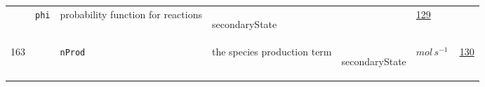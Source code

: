 \begin{longtable}{|p{1cm}|p{2.5cm}|p{4.5cm}|p{8cm}|p{3.0cm}|p{3cm}|p{1cm}|}
             & \verb|phi|
             & probability function for reactions
             & \begin{lay}secondaryState \end{lay}
             & $  $
             &                 \hyperlink{"e:129"}{ 129 }
                 \\
        163
             & \hypertarget{"v:163"}{ $ {} $}
             & \verb|nProd|
             & the species production term
             & \begin{lay}secondaryState \end{lay}
             & $ mol \,s^{-1} \, $
             &                 \hyperlink{"e:130"}{ 130 }
                 \\
    \end{longtable}